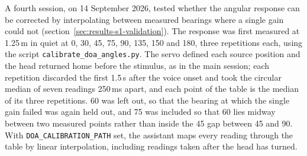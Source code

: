 

A fourth session, on 14 September 2026, tested whether the angular response can
be corrected by interpolating between measured bearings where a single gain could
not (section~\ref{sec:results-s1-validation}). The response was first measured at
1.25\,m in quiet at 0, 30, 45, 75, 90, 135, 150 and 180\textdegree{}, three
repetitions each, using the script \texttt{calibrate\_doa\_angles.py}. The servo defined each
source position and the head returned home before the stimulus, as in the main
session; each repetition discarded the first 1.5\,s after the voice onset and took
the circular median of seven readings 250\,ms apart, and each point of the table
is the median of its three repetitions. 60\textdegree{} was left out, so that the
bearing at which the single gain failed was again held out, and 75\textdegree{} was
included so that 60\textdegree{} lies midway between two measured points rather
than inside the 45\textdegree{} gap between 45\textdegree{} and 90\textdegree{}.
With \texttt{DOA\_CALIBRATION\_PATH} set, the assistant maps every reading through
the table by linear interpolation, including readings taken after the head has
turned.

